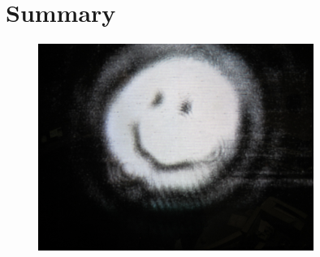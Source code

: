 \chapter{Summary}

\begin{figure}
\begin{centering}
\includegraphics[width=0.8\textwidth]{figures/PMCRefl_smiley.JPG}
\label{fig:smiley}
\end{centering}
\end{figure}


\the\columnwidth